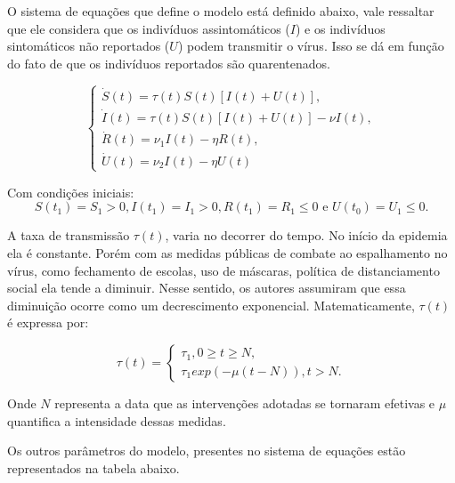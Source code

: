 \documentclass[12pt]{article}
\begin{document}
O sistema de equações que define o modelo está definido abaixo, vale ressaltar que ele considera que os indivíduos assintomáticos ($I$) e os indivíduos sintomáticos não reportados ($U$) podem transmitir o vírus. Isso se dá em função do fato de que os indivíduos reportados são quarentenados.
\begin{center}
$$
    \begin{cases}
    \dot S(t) = \tau(t)S(t)[I(t) + U(t)],\\
    \dot I(t) = \tau(t)S(t)[I(t) + U(t)] - \nu I(t),\\
    \dot R(t) = \nu_1I(t) - \eta R(t),\\
    \dot U(t) = \nu_2I(t) - \eta U(t)
    \end{cases}
$$
\end{center}
Com condições iniciais: 
$$S(t_1) = S_1>0, I(t_1) = I_1>0, R(t_1) = R_1 \leq 0 \text{ e } U(t_0) = U_1 \leq 0.$$

A taxa de transmissão $\tau(t)$, varia no decorrer do tempo. No início da epidemia ela é constante. Porém com as medidas públicas de combate ao espalhamento no vírus, como fechamento de escolas, uso de máscaras, política de distanciamento social ela tende a diminuir. Nesse sentido, os autores assumiram que essa diminuição ocorre como um decrescimento exponencial. Matematicamente, $\tau(t)$ é expressa por:
\begin{center}
$$
     \tau(t) =
    \begin{cases}
    \tau_1, 0 \geq t \geq N,\\
    \tau_1 exp(-\mu(t-N)), t > N.
    \end{cases}
$$
\end{center}
Onde $N$ representa a data que as intervenções adotadas se tornaram efetivas e $\mu$ quantifica a intensidade dessas medidas.

Os outros parâmetros do modelo, presentes no sistema de equações estão representados na tabela abaixo. 
\end{document}
